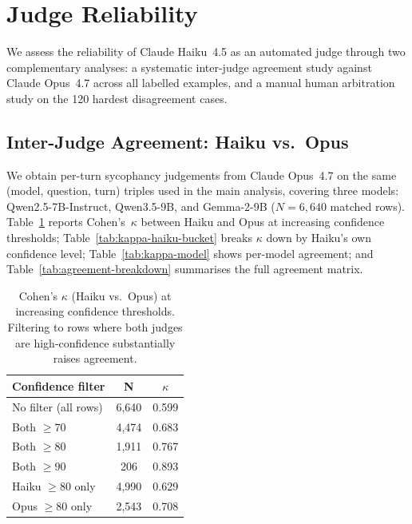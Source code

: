 \documentclass[11pt]{article}
\begin{document}


\appendix

 \section{Judge Reliability}
  \label{appendix:labeling:reliability}

  We assess the reliability of Claude Haiku~4.5 as an automated judge \citep{10.5555/3666122.3668142} through
  two complementary analyses: a systematic inter-judge agreement study against
  Claude Opus~4.7 across all labelled examples, and a manual human arbitration
  study on the 120 hardest disagreement cases.

  \subsection*{Inter-Judge Agreement: Haiku vs.\ Opus}

  We obtain per-turn sycophancy judgements from Claude Opus~4.7 on the same
  (model, question, turn) triples used in the main analysis, covering three
  models: Qwen2.5-7B-Instruct, Qwen3.5-9B, and Gemma-2-9B ($N = 6{,}640$
  matched rows). Table~\ref{tab:kappa-threshold} reports Cohen's~$\kappa$
  between Haiku and Opus at increasing confidence thresholds; Table~\ref{tab:kappa-haiku-bucket}
  breaks $\kappa$ down by Haiku's own confidence level; Table~\ref{tab:kappa-model}
  shows per-model agreement; and Table~\ref{tab:agreement-breakdown} summarises
  the full agreement matrix.

  \begin{table}[h]
  \centering
  \small
  \caption{Cohen's $\kappa$ (Haiku vs.\ Opus) at increasing confidence
    thresholds. Filtering to rows where both judges are high-confidence
    substantially raises agreement.}
  \label{tab:kappa-threshold}
  \begin{tabular}{lcc}
  \toprule
  \textbf{Confidence filter} & \textbf{N} & \textbf{$\kappa$} \\
  \midrule
  No filter (all rows)        & 6,640 & 0.599 \\
  Both $\geq 70$              & 4,474 & 0.683 \\
  Both $\geq 80$              & 1,911 & 0.767 \\
  Both $\geq 90$              &   206 & 0.893 \\
  \addlinespace
  Haiku $\geq 80$ only        & 4,990 & 0.629 \\
  Opus $\geq 80$ only         & 2,543 & 0.708 \\
  \bottomrule
  \end{tabular}
  \end{table}
\end{document}

